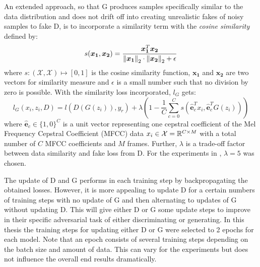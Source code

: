 An extended approach, so that G produces samples specifically similar to the data distribution and does not drift off into creating unrealistic fakes of noisy samples to fake D, is to incorporate a similarity term with the \emph{cosine similarity} defined by:
\begin{equation}
  s(\bm{x_1}, \bm{x_2}) = \frac{\bm{x_1}^T \bm{x_2}}{\norm{\bm{x_1}}_2 \cdot \norm{\bm{x_2}}_2 + \epsilon} 
\end{equation}
where $s : (\mathcal{X}, \mathcal{X}) \mapsto [0, 1]$ is the cosine similarity function, $\bm{x_1}$ and $\bm{x_2}$ are two vectors for similarity measure and $\epsilon$ is a small number such that no division by zero is possible.
With the similarity loss incorporated, $l_G$ gets:
\begin{equation}
  l_G(x_i, z_i, D) =  l(D(G(z_i)), y_r) + \lambda \left(1 - \frac{1}{C} \sum_{c=0}^{C} s(\hat{\bm{e}}_c^T x_i , \hat{\bm{e}}_c^T G(z_i)) \right)
\end{equation}
where $\hat{\bm{e}}_c \in \{1, 0\}^C$ is a unit vector representing one cepstral coefficient of the Mel Frequency Cepstral Coefficient (MFCC) data $x_i \in \mathcal{X} = \mathbb{R}^{C \times M}$ with a total number of $C$ MFCC coefficients and $M$ frames.
Further, $\lambda$ is a trade-off factor between data similarity and fake loss from D.
For the experiments in , $\lambda = 5$ was chosen.

The update of D and G performs in each training step by backpropagating the obtained losses.
However, it is more appealing to update D for a certain numbers of training steps with no update of G and then alternating to updates of G without updating D.
This will give either D or G some update steps to improve in their specific adversarial task of either discriminating or generating.
In this thesis the training steps for updating either D or G were selected to 2 epochs for each model.
Note that an epoch consists of several training steps depending on the batch size and amount of data.
This can vary for the experiments but does not influence the overall end results dramatically.



